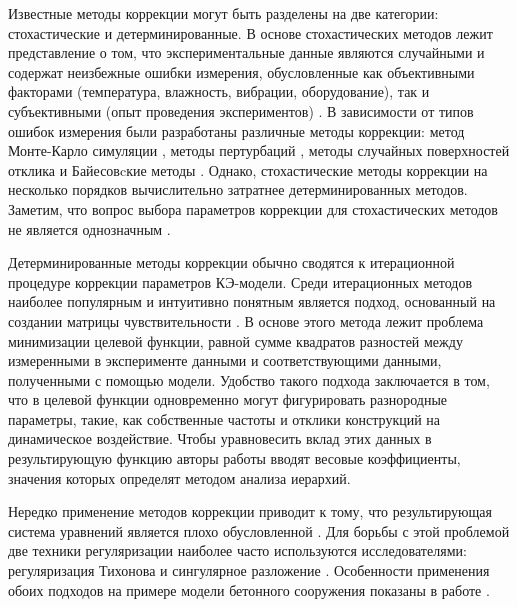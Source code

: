 Известные методы коррекции могут быть разделены на две категории: стохастические и детерминированные. В основе стохастических методов лежит представление о том, что экспериментальные данные являются случайными и содержат неизбежные ошибки измерения, обусловленные как объективными факторами (температура, влажность, вибрации, оборудование), так и субъективными (опыт проведения экспериментов) \cite{lib:modelUpdating:Huang}. В зависимости от типов ошибок измерения были разработаны различные методы коррекции: метод Монте-Карло симуляции \cite{lib:modelUpdating:Bao, lib:modelUpdating:Boulkaibet}, методы пертурбаций \cite{lib:modelUpdating:Wang&He, lib:modelUpdating:Deng}, методы случайных поверхностей отклика \cite{lib:modelUpdating:Zhai&Fei, lib:modelUpdating:Fang} и Байесовcкие методы \cite{lib:modelUpdating:Xin&Hao, lib:modelUpdating:Lam}. Однако, стохастические методы коррекции на несколько порядков вычислительно затратнее детерминированных методов. Заметим, что вопрос выбора параметров коррекции для стохастических методов не является однозначным \cite{lib:modelUpdating:Yuan&Liang}.

Детерминированные методы коррекции обычно сводятся к итерационной процедуре коррекции параметров КЭ-модели. Среди итерационных методов наиболее популярным и интуитивно понятным является подход, основанный на создании матрицы чувствительности \cite{lib:modelUpdating:Mottershead, lib:modelUpdating:Bakir, lib:modelUpdating:Min, lib:modelUpdating:Hernandez}. В основе этого метода лежит проблема минимизации целевой функции, равной сумме квадратов разностей между измеренными в эксперименте данными и соответствующими данными, полученными с помощью модели. Удобство такого подхода заключается в том, что в целевой функции одновременно могут фигурировать разнородные параметры, такие, как собственные частоты и отклики конструкций на динамическое воздействие. Чтобы уравновесить вклад этих данных в результирующую функцию авторы работы \cite{lib:modelUpdating:Chen&Guo} вводят весовые коэффициенты, значения которых определят методом анализа иерархий.
 
Нередко применение методов коррекции приводит к тому, что результирующая система уравнений является плохо обусловленной \cite{lib:modelUpdating:Hua}. Для борьбы с этой проблемой две техники регуляризации наиболее часто используются исследователями: регуляризация Тихонова \cite{lib:modelUpdating:Li&Law, lib:modelUpdating:Reumers} и сингулярное разложение \cite{lib:modelUpdating:Mantilla-Gaviria}. Особенности применения обоих подходов на примере модели бетонного сооружения показаны в работе \cite{lib:modelUpdating:Weber}.

